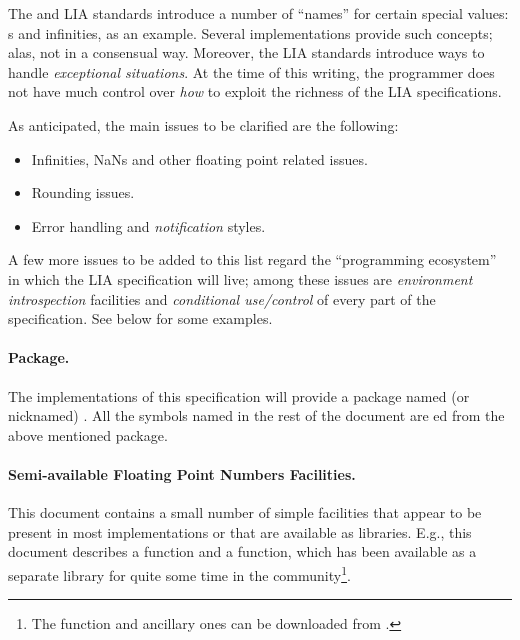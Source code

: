 \documentclass[../../CDR-IEEE-754-support.tex]{subfiles}
\begin{document}
The \IEEEFPStd{} and LIA standards introduce a number of ``names'' for
certain special values: s and infinities, as an example.
Several \CL{} implementations provide such concepts; alas, not in a
consensual way.  Moreover, the LIA standards introduce ways to handle
\emph{exceptional situations}. At the time of this writing, the \CL{}
programmer does not have much control over \emph{how} to exploit the
richness of the LIA specifications.


\noindent
As anticipated, the main issues to be clarified are the following:
\begin{itemize}
\item Infinities, \textsf{NaN}s and other floating point related
  issues.
\item Rounding issues.
\item Error handling and \emph{notification} styles.
\end{itemize}
%
A few more issues to be added to this list regard the ``programming
ecosystem'' in which the \CL{} LIA specification will live; among
these issues are \emph{environment introspection} facilities and
\emph{conditional use/control} of every part of the \CL{}
specification. See below for some examples.


\paragraph{\CLLIAPKG{} Package.}
\label{sect:package}
%
The implementations of this specification will provide a package named
(or nicknamed) \CLLIAPKG{}.  All the symbols named in the rest
of the document are ed from the above mentioned package.


\paragraph{Semi-available Floating Point Numbers Facilities.}
%
This document contains a small number of simple facilities that appear
to be present in most \CL{} implementations or that are available as
libraries.  E.g., this document describes a  function
and a  function, which has been available as a
separate library for quite some time in the community\footnote{The
   function and ancillary ones can be downloaded
  from \Quicklisp{} \cite{2008:Beane:Quicklisp}.}.
\end{document}
